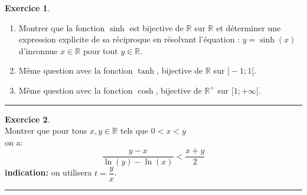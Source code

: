 \documentclass[10pt,a4paper]{article}
\newcommand{\R}{\mathbb{R}}
\theoremstyle{definition}
\theoremstyle{definition}
\newtheorem{exo}{Exercice}
\begin{document}
\begin{center}
\begin{minipage}[t]{0.47\linewidth}
\begin{exo}\quad\\
\begin{enumerate}
\item Montrer que la fonction $\sinh$ est bijective de $\R$ sur $\R$ et déterminer une expression explicite de sa réciproque en résolvant l'équation : $y = \sinh(x)$ d'inconnue $x\in\R$ pour tout $y\in\R$.
\item Même question avec la fonction $\tanh$, bijective de $\R$ sur $]-1;1[$. 
\item Même question avec la fonction $\cosh$, bijective de $\R^+$ sur $[1;+\infty[$.
\end{enumerate}
\end{exo}
\begin{center}
\rule{1\linewidth}{0.6pt}
\end{center}
\begin{exo}\quad\\
Montrer que pour tous $x,y\in\R$ tels que $0<x<y$\\
 on a:
$$\dfrac{y-x}{\ln(y)-\ln(x)} < \dfrac{x+y}{2}$$
\textbf{indication:} on utilisera   $t=\dfrac{y}{x}$. 
\end{exo}

\begin{center}
\rule{1\linewidth}{0.6pt}
\end{center}
	\end{minipage}
\end{center}
\end{document}
